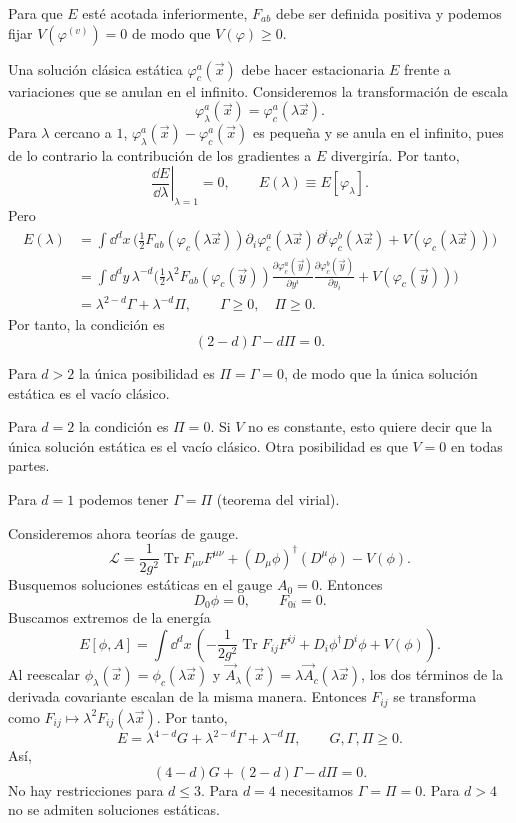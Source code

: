 \documentclass[11pt,a4paper]{article}
\newcommand{\Tr}{\operatorname{Tr}}
\begin{document}
Para que $E$ esté acotada inferiormente, $F_{ab}$ debe ser definida positiva
y podemos fijar $V(\varphi^{(v)})=0$ de modo que $V(\varphi)\geq0$.

Una solución clásica estática $\varphi_c^a(\vec{x})$ debe hacer estacionaria
$E$ frente a variaciones que se anulan en el infinito. Consideremos la
transformación de escala
\[
\varphi_\lambda^a(\vec{x})=\varphi_c^a(\lambda\vec{x}).
\]
Para $\lambda$ cercano a $1$, $\varphi_\lambda^a(\vec{x})-\varphi_c^a(\vec{x})$
es pequeña y se anula en el infinito, pues de lo contrario la contribución
de los gradientes a $E$ divergiría. Por tanto,
\[
\left.\frac{\dd E}{\dd\lambda}\right|_{\lambda=1}=0,
\qquad E(\lambda)\equiv E[\varphi_\lambda].
\]
Pero
\begin{align*}
E(\lambda)
 &= \int\dd^d x\,\biggl(
     \frac12 F_{ab}(\varphi_c(\lambda\vec{x}))
       \partial_i\varphi_c^a(\lambda\vec{x})\,
       \partial^i\varphi_c^b(\lambda\vec{x})
       +V(\varphi_c(\lambda\vec{x}))\biggr)\\
 &= \int\dd^d y\,\lambda^{-d}\biggl(
     \frac12\lambda^2 F_{ab}(\varphi_c(\vec{y}))
       \frac{\partial\varphi_c^a(\vec{y})}{\partial y^i}
       \frac{\partial\varphi_c^b(\vec{y})}{\partial y_i}
       + V(\varphi_c(\vec{y}))\biggr)\\
 &= \lambda^{2-d}\Gamma+\lambda^{-d}\Pi,
 \qquad \Gamma\geq0,\quad\Pi\geq0.
\end{align*}
Por tanto, la condición es
\[
(2-d)\Gamma-d\Pi=0.
\]

Para $d>2$ la única posibilidad es $\Pi=\Gamma=0$, de modo que la única
solución estática es el vacío clásico.

Para $d=2$ la condición es $\Pi=0$. Si $V$ no es constante, esto quiere decir
que la única solución estática es el vacío clásico. Otra posibilidad es
que $V=0$ en todas partes.

Para $d=1$ podemos tener $\Gamma=\Pi$ (teorema del virial).

Consideremos ahora teorías de gauge.
\[
\mathcal L=\frac{1}{2g^2}\Tr F_{\mu\nu}F^{\mu\nu}
  +(D_\mu\phi)^\dagger(D^\mu\phi)-V(\phi).
\]
Busquemos soluciones estáticas en el gauge $A_0=0$. Entonces
\[
D_0\phi=0,\qquad F_{0i}=0.
\]
Buscamos extremos de la energía
\[
E[\phi,A]=\int\dd^d x\,
  \left(-\frac{1}{2g^2}\Tr F_{ij}F^{ij}
        +D_i\phi^\dagger D^i\phi+V(\phi)\right).
\]
Al reescalar $\phi_\lambda(\vec{x})=\phi_c(\lambda\vec{x})$ y
$\vec{A}_\lambda(\vec{x})=\lambda\vec{A}_c(\lambda\vec{x})$, los dos
términos de la derivada covariante escalan de la misma manera.
Entonces $F_{ij}$ se transforma como $F_{ij}\mapsto\lambda^2F_{ij}(\lambda\vec{x})$.
Por tanto,
\[
E=\lambda^{4-d}G+\lambda^{2-d}\Gamma+\lambda^{-d}\Pi,
\qquad G,\Gamma,\Pi\geq0.
\]
Así,
\[
(4-d)G+(2-d)\Gamma-d\Pi=0.
\]
No hay restricciones para $d\leq3$. Para $d=4$ necesitamos
$\Gamma=\Pi=0$. Para $d>4$ no se admiten soluciones estáticas.
\end{document}
